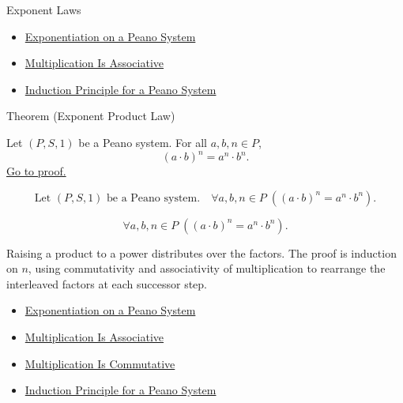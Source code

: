 \begin{topicbox}{Exponent Laws}
\begin{dependencies}
\begin{itemize}
  \item \hyperref[def:exponentiation-on-peano-system]{Exponentiation on a Peano System}
  \item \hyperref[thm:multiplication-associative]{Multiplication Is Associative}
  \item \hyperref[thm:induction-principle-for-peano-system]{Induction Principle for a Peano System}
\end{itemize}
\end{dependencies}

\begin{theorembox}{Theorem (Exponent Product Law)}
\begin{theorem}
\label{thm:exponent-product-law}
Let $(P,S,1)$ be a Peano system. For all $a,b,n \in P$,
\[
(a \cdot b)^n = a^n \cdot b^n.
\]
\hyperref[prf:exponent-product-law]{Go to proof.}
\end{theorem}
\end{theorembox}

\begin{remark*}
\[
\text{Let } (P,S,1) \text{ be a Peano system.}\quad
\forall a,b,n \in P\;((a \cdot b)^n = a^n \cdot b^n).
\]
\end{remark*}

\begin{remark*}
\[
\forall a,b,n \in P\;((a \cdot b)^n = a^n \cdot b^n).
\]
\end{remark*}

\begin{remark*}[Interpretation]
Raising a product to a power distributes over the factors. The proof is
induction on $n$, using commutativity and associativity of multiplication to
rearrange the interleaved factors at each successor step.
\end{remark*}

\begin{dependencies}
\begin{itemize}
  \item \hyperref[def:exponentiation-on-peano-system]{Exponentiation on a Peano System}
  \item \hyperref[thm:multiplication-associative]{Multiplication Is Associative}
  \item \hyperref[thm:multiplication-commutative]{Multiplication Is Commutative}
  \item \hyperref[thm:induction-principle-for-peano-system]{Induction Principle for a Peano System}
\end{itemize}
\end{dependencies}


\end{topicbox}
